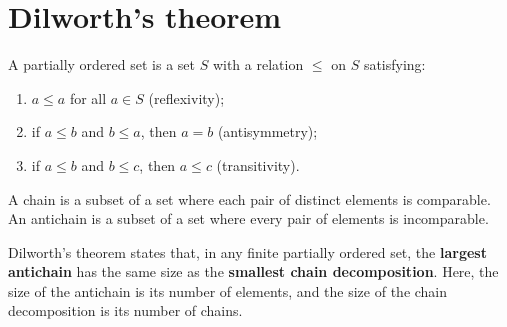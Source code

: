 \section*{Dilworth’s theorem}

A partially ordered set is a set $S$ with a relation $\le$ on $S$ satisfying:
\begin{enumerate}
\item $a \le a$ for all $a \in S$ (reflexivity);
\item if $a \le b$ and $b \le a$, then $a = b$ (antisymmetry);
\item if $a \le b$ and $b \le c$, then $a \le c$ (transitivity).
\end{enumerate}

A chain is a subset of a set where each pair of distinct elements is comparable.
An antichain is a subset of a set where every pair of elements is incomparable.

Dilworth's theorem states that, in any finite partially ordered set, 
the \textbf{largest antichain} has the same size as the \textbf{smallest chain decomposition}.
Here, the size of the antichain is its number of elements, and the size of the chain decomposition is its number of chains.

